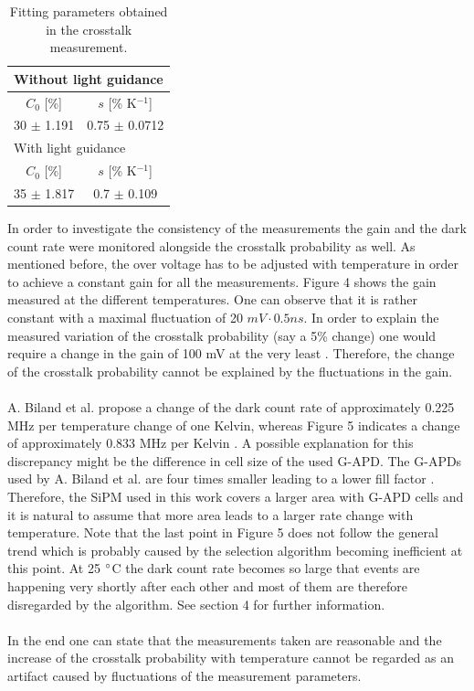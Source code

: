 \documentclass[10pt,a4paper]{article}
\begin{document}
\begin{table}[H]
\centering
\caption{Fitting parameters obtained in the crosstalk measurement.}
\begin{tabular}{|c|c|}
\hline 
 \multicolumn{2}{|l|}{Without light guidance} \\ 
\hline 
$C_0$ [\%] & $s$ [\% K$^{-1}$] \\ 
\hline 
30 $\pm$ 1.191 & 0.75 $\pm$ 0.0712 \\ 
\hline 
 \multicolumn{2}{|l|}{With light guidance} \\ 
\hline 
$C_0$ [\%] & $s$ [\% K$^{-1}$] \\ 
\hline 
35 $\pm$ 1.817 & 0.7 $\pm$ 0.109 \\ 
\hline 
\end{tabular} 
\label{Table 4}
\end{table}
\begin{multicols}{2} \noindent
In order to investigate the consistency of the measurements the gain and the dark count rate were monitored alongside the crosstalk probability as well. As mentioned before, the over voltage has to be adjusted with temperature in order to achieve a constant gain for all the measurements. Figure 4 shows the gain measured at the different temperatures. One can observe that it is rather constant with a maximal fluctuation of 20 $mV \cdot 0.5ns$. In order to explain the measured variation of the crosstalk probability (say a 5\% change) one would require a change in the gain of 100 mV at the very least \cite{hamaref}. Therefore, the change of the crosstalk probability cannot be explained by the fluctuations in the gain. \\ \\ \noindent
A. Biland et al. propose a change of the dark count rate of approximately 0.225 MHz per temperature change of one Kelvin, whereas Figure 5 indicates a change of approximately 0.833 MHz per Kelvin \cite{gapd}. A possible explanation for this discrepancy might be the difference in cell size of the used G-APD. The G-APDs used by A. Biland et al. are four times smaller leading to a lower fill factor \cite{diode}. Therefore, the SiPM used in this work covers a larger area with G-APD cells and it is natural to assume that more area leads to a larger rate change with temperature. Note that the last point in Figure 5 does not follow the general trend which is probably caused by the selection algorithm becoming inefficient at this point. At 25 $\degree$C the dark count rate becomes so large that events are happening very shortly after each other and most of them are therefore disregarded by the algorithm. See section 4 for further information. \\ \\ \noindent
In the end one can state that the measurements taken are reasonable and the increase of the crosstalk probability with temperature cannot be regarded as an artifact caused by fluctuations of the measurement parameters.
\end{multicols}
\end{document}
